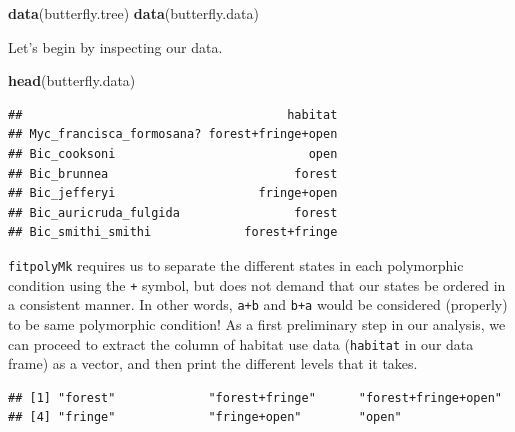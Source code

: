 \documentclass[fleqn,10pt,lineno]{wlpeerj} %
\newenvironment{Shaded}{\begin{snugshade}}{\end{snugshade}}
\newcommand{\FunctionTok}[1]{\textcolor[rgb]{0.13,0.29,0.53}{\textbf{#1}}}
\newcommand{\NormalTok}[1]{#1}
\newcommand{\OtherTok}[1]{\textcolor[rgb]{0.56,0.35,0.01}{#1}}
\newcommand{\SpecialCharTok}[1]{\textcolor[rgb]{0.81,0.36,0.00}{\textbf{#1}}}
\begin{document}
\begin{Shaded}
\begin{Highlighting}[]
\FunctionTok{data}\NormalTok{(butterfly.tree)}
\FunctionTok{data}\NormalTok{(butterfly.data)}
\end{Highlighting}
\end{Shaded}

Let's begin by inspecting our data.

\begin{Shaded}
\begin{Highlighting}[]
\FunctionTok{head}\NormalTok{(butterfly.data)}
\end{Highlighting}
\end{Shaded}

\begin{verbatim}
##                                     habitat
## Myc_francisca_formosana? forest+fringe+open
## Bic_cooksoni                           open
## Bic_brunnea                          forest
## Bic_jefferyi                    fringe+open
## Bic_auricruda_fulgida                forest
## Bic_smithi_smithi             forest+fringe
\end{verbatim}

\texttt{fitpolyMk} requires us to separate the different states in each polymorphic condition using the \texttt{+} symbol, but does not demand that our states be ordered in a consistent manner. In other words, \texttt{a+b} and \texttt{b+a} would be considered (properly) to be same polymorphic condition! As a first preliminary step in our analysis, we can proceed to extract the column of habitat use data (\texttt{habitat} in our data frame) as a vector, and then print the different levels that it takes.

\begin{Shaded}
\end{Shaded}

\begin{verbatim}
## [1] "forest"             "forest+fringe"      "forest+fringe+open"
## [4] "fringe"             "fringe+open"        "open"
\end{verbatim}
\end{document}
